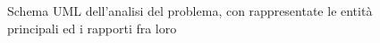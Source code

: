 \begin{figure}[H]
    \centering
    \caption{Schema UML dell'analisi del problema, con rappresentate le entità principali ed i rapporti fra loro}
	\label{img:entity_diagram}
\end{figure}
